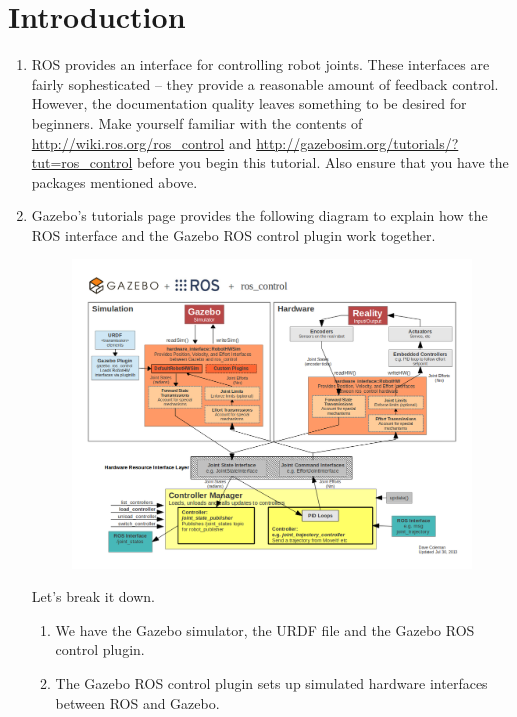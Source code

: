 \documentclass{article}
\begin{document}
    \section{Introduction}
        \begin{enumerate}
            \item ROS provides an interface for controlling robot joints. These interfaces are fairly sophesticated -- they provide a reasonable 
            amount of feedback control. However, the documentation quality leaves something to be desired for beginners. Make yourself familiar with the 
            contents of \url{http://wiki.ros.org/ros_control} and \url{http://gazebosim.org/tutorials/?tut=ros_control} before you begin this tutorial. Also ensure 
            that you have the packages mentioned above.
            \item Gazebo's tutorials page provides the following diagram to explain how the ROS interface and the 
            Gazebo ROS control plugin work together.
            \begin{figure}[H]
                \center
                \includegraphics[width = \textwidth]{image_1.png}
            \end{figure}
            Let's break it down.
            \begin{enumerate}
                \item We have the Gazebo simulator, the URDF file and the Gazebo ROS control plugin.
                \item The Gazebo ROS control plugin sets up simulated hardware interfaces between ROS and Gazebo.

\end{enumerate}
\end{enumerate}
\end{document}

